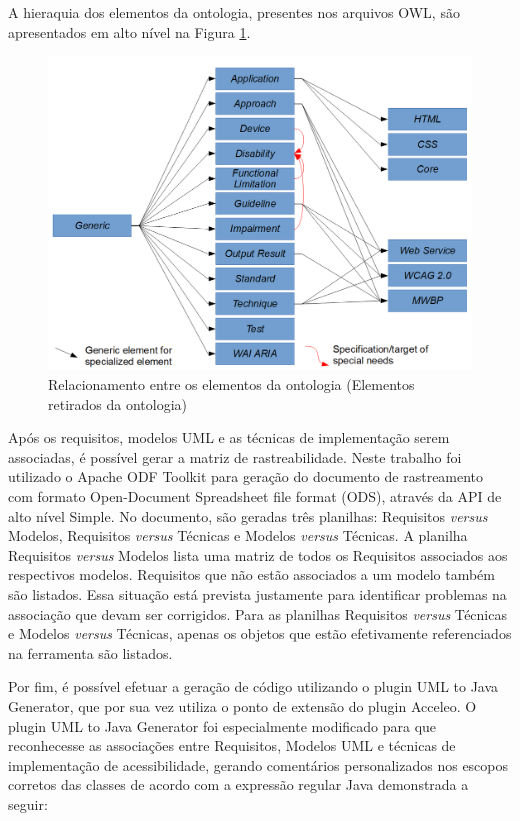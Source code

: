 \documentclass[runningheads,a4paper]{llncs}
\begin{document}
A hieraquia dos elementos da ontologia, presentes nos arquivos OWL, são apresentados em alto nível na Figura \ref{fig:ontologyrelationship}.

\begin{figure}[h!]
\centering
\includegraphics[scale=0.18]{./img/ontologyrelationship.png}
\caption{Relacionamento entre os elementos da ontologia (Elementos retirados
da ontologia)}
\label{fig:ontologyrelationship}
\end{figure}

Após os requisitos, modelos UML e as técnicas de implementação serem associadas, é possível gerar a matriz de rastreabilidade.
Neste trabalho foi utilizado o Apache ODF Toolkit para geração do documento de rastreamento com formato Open-Document Spreadsheet file format (ODS), através da API de alto nível Simple. No documento, são geradas três planilhas: Requisitos \textit{versus} Modelos, Requisitos \textit{versus} Técnicas e Modelos \textit{versus} Técnicas. A planilha Requisitos \textit{versus} Modelos lista uma matriz de todos os Requisitos associados aos respectivos modelos. Requisitos que não estão associados a um modelo também são listados. Essa situação está prevista
justamente para identificar problemas na associação que devam ser corrigidos. Para as
planilhas Requisitos \textit{versus} Técnicas e Modelos \textit{versus} Técnicas, apenas os objetos que
estão efetivamente referenciados na ferramenta são listados.

Por fim, é possível efetuar a geração de código utilizando o plugin UML to Java Generator, que por sua vez utiliza o ponto de extensão do plugin Acceleo.
O plugin UML to Java Generator foi especialmente modificado para que reconhecesse as associações entre Requisitos, Modelos UML e técnicas de implementação de acessibilidade, gerando comentários personalizados nos escopos corretos das classes de acordo com a expressão regular Java demonstrada a seguir:
\end{document}
